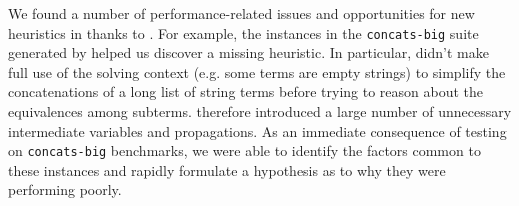 We found a number of performance-related issues and opportunities for
new heuristics in \us{} thanks to \fuzzer{}. For example, the
instances in the \texttt{concats-big} suite generated by \fuzzer{}
helped us discover a missing heuristic. In particular, \us{} didn't
make full use of the solving context (e.g. some terms are empty
strings) to simplify the concatenations of a long list of string terms
before trying to reason about the equivalences among subterms. \us{}
therefore introduced a large number of unnecessary intermediate
variables and propagations. As an immediate consequence of
testing \us{} on \texttt{concats-big} benchmarks, we were able to
identify the factors common to these instances and rapidly formulate a
hypothesis as to why they were performing poorly.


